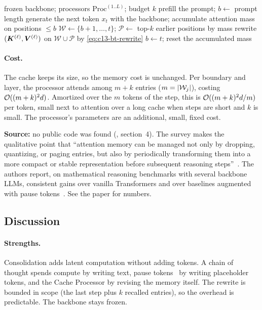 \begin{algorithm}[t]
\caption{Generation with periodic KV consolidation (our formalization)}\label{alg:c13-bt}
\begin{algorithmic}[1]
\Require frozen backbone; processors $\mathrm{Proc}^{(1..L)}$; budget $k$
\State prefill the prompt; $b\gets$ prompt length
\Repeat
  \State generate the next token $x_t$ with the backbone; accumulate attention mass on positions $\le b$
     
      \State $\mathcal{W}\gets\{b+1,\dots,t\}$; $\mathcal{P}\gets$ top-$k$ earlier positions by mass
      \State rewrite $(\bm{K}^{(\ell)},\bm{V}^{(\ell)})$ on $\mathcal{W}\cup\mathcal{P}$ by \eqref{eq:c13-bt-rewrite}
    \EndFor
    \State $b\gets t$; reset the accumulated mass
  \EndIf
{}
\end{algorithmic}
\end{algorithm}

\paragraph{Cost.} The cache keeps its size, so the memory cost is unchanged. Per boundary and layer, the
processor attends among $m+k$ entries ($m=\left\lvert \mathcal{W}_j\right\rvert$), costing $\mathcal{O}((m+k)^2d)$. Amortized over
the $m$ tokens of the step, this is $\mathcal{O}((m+k)^2d/m)$ per token, small next to attention over a long
cache when steps are short and $k$ is small. The processor's parameters are an additional, small, fixed cost.

\begin{results}
\textbf{Source:} no public code was found (, section~4). The survey makes the
qualitative point that ``attention memory can be managed not only by dropping, quantizing, or paging
entries, but also by periodically transforming them into a more compact or stable representation
before subsequent reasoning steps''~\citep{zhoubian2026memory}. The authors report, on mathematical
reasoning benchmarks with several backbone LLMs, consistent gains over vanilla Transformers and over
baselines augmented with pause tokens~\citep{c13-goyal2024pause}. See the paper for numbers.
\end{results}

\subsection{Discussion}

\paragraph{Strengths.} Consolidation adds latent computation without adding tokens. A chain of thought
spends compute by writing text, pause tokens~\citep{c13-goyal2024pause} by writing placeholder tokens,
and the Cache Processor by revising the memory itself. The rewrite is bounded in scope (the last step
plus $k$ recalled entries), so the overhead is predictable. The backbone stays frozen.

